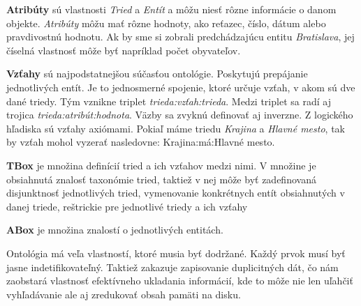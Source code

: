 \documentclass[12pt, a4paper, oneside]{book}
\begin{document}
\textbf{Atribúty} sú vlastnosti \textit{Tried} a \textit{Entít} a môžu niesť rôzne informácie o danom objekte. \textit{Atribúty} môžu mať rôzne hodnoty, ako reťazec, číslo, dátum alebo pravdivostnú hodnotu. Ak by sme si zobrali predchádzajúcu entitu \textit{Bratislava}, jej číselná vlastnosť môže byť napríklad počet obyvateľov.


\textbf{Vzťahy} sú najpodstatnejšou súčasťou ontológie. Poskytujú prepájanie jednotlivých entít. Je to jednosmerné spojenie, ktoré určuje vzťah, v akom sú dve dané triedy. Tým vznikne triplet \textit{trieda:vzťah:trieda}. Medzi triplet sa radí aj trojica \textit{trieda:atribút:hodnota}. Väzby sa zvyknú definovať aj inverzne. Z logického hľadiska sú vzťahy axiómami. Pokiaľ máme triedu \textit{Krajina} a \textit{Hlavné mesto}, tak by vzťah mohol vyzerať nasledovne: Krajina:má:Hlavné mesto.


\textbf{TBox} je množina definícií tried a ich vzťahov medzi nimi. V množine je obsiahnutá znalosť taxonómie tried, taktiež v nej môže byť zadefinovaná disjunktnosť jednotlivých tried, vymenovanie konkrétnych entít obsiahnutých v danej triede, reštrickie pre jednotlivé triedy a ich vzťahy


\textbf{ABox} je množina znalostí o jednotlivých entitách.


Ontológia má veľa vlastností, ktoré musia byť dodržané. Každý prvok musí byť jasne indetifikovateľný. Taktiež zakazuje zapisovanie duplicitných dát, čo nám zaobstará vlastnosť efektívneho ukladania informácií, kde to môže nie len uľahčiť vyhľadávanie ale aj zredukovať obsah pamäti na disku. 

\end{document}
